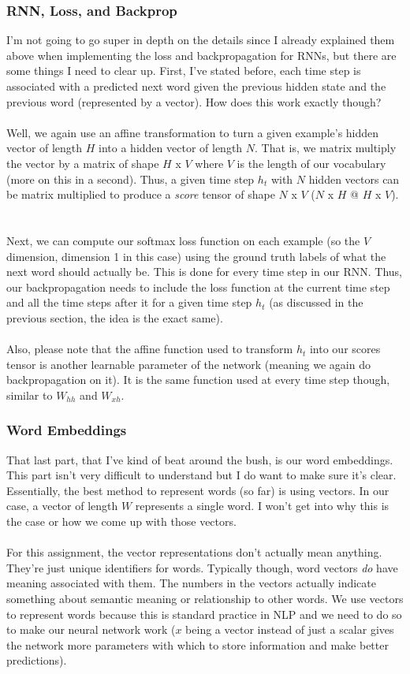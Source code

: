 \documentclass[12pt]{article}
\begin{document}
\subsubsection{RNN, Loss, and Backprop}
I'm not going to go super in depth on the details since I already explained them 
above when implementing the loss and backpropagation for RNNs, but there are some 
things I need to clear up. First, I've stated before, each time step is associated with a 
predicted next word given the previous hidden state and the previous word (represented 
by a vector). How does this work exactly though? 
~\\
~\\
Well, we again use an affine transformation to turn a given example's hidden vector of 
length $H$ into a hidden vector of length $N$. That is, we matrix multiply the vector by 
a matrix of shape $H$ x $V$ where $V$ is the length of our vocabulary (more on this in a 
second). Thus, a given time step $h_t$ with $N$ hidden vectors can be matrix multiplied 
to produce a \emph{score} tensor of shape $N$ x $V$ ($N$ x $H$ @ $H$ x $V$). 
~\\
~\\
Next, we can compute our softmax loss function on each example (so the $V$ dimension, 
dimension 1 in this case) using the ground truth labels of what the next word should 
actually be. This is done for every time step in our RNN. Thus, our backpropagation needs
to include the loss function at the current time step and all the time steps after it 
for a given time step $h_t$ (as discussed in the previous section, the idea is the exact 
same). 
~\\
~\\
Also, please note that the affine function used to transform $h_t$ into our scores tensor 
is another learnable parameter of the network (meaning we again do backpropagation on it). 
It is the same function used at every time step though, similar to $W_{hh}$ and $W_{xh}$. 

\subsubsection{Word Embeddings}
That last part, that I've kind of beat around the bush, is our word embeddings. This part
isn't very difficult to understand but I do want to make sure it's clear. Essentially, 
the best method to represent words (so far) is using vectors. In our case, a vector of 
length $W$ represents a single word. I won't get into why this is the case or how we come 
up with those vectors. 
~\\
~\\
For this assignment, the vector representations don't actually mean anything. They're just 
unique identifiers for words. Typically though, word vectors \emph{do} have meaning associated 
with them. The numbers in the vectors actually indicate something about semantic meaning or
relationship to other words. We use vectors to represent words because this is standard 
practice in NLP and we need to do so to make our neural network work ($x$ being a vector
instead of just a scalar gives the network more parameters with which to store information 
and make better predictions). 
\end{document}
